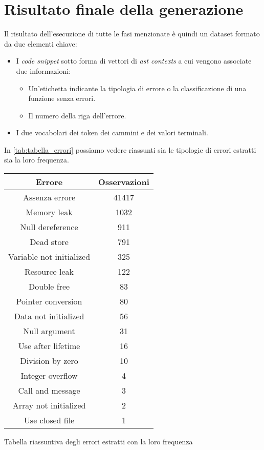 \section{Risultato finale della generazione}
Il risultato dell'esecuzione di tutte le fasi menzionate è quindi un dataset formato da due elementi chiave:
    \begin{itemize}
        \item I \textit{code snippet} sotto forma di vettori di \textit{ast contexts} a cui vengono associate due informazioni:
        \begin{itemize}
            \item Un'etichetta indicante la tipologia di errore o la classificazione di una funzione senza errori.
            \item Il numero della riga dell'errore.
        \end{itemize}
        \item I due vocabolari dei token dei cammini e dei valori terminali.
    \end{itemize}
In \autoref{tab:tabella_errori} possiamo vedere riassunti sia le tipologie di errori estratti sia la loro frequenza.
    \begin{center}
      \begin{tabular}{|c|c|}
        \hline
        Errore & Osservazioni \\
        \hline
        Assenza errore & 41417 \\
        \hline
        Memory leak & 1032 \\
        \hline
        Null dereference & 911 \\
        \hline
        Dead store & 791 \\
        \hline
        Variable not initialized & 325 \\
        \hline
        Resource leak & 122 \\
        \hline
        Double free & 83 \\
        \hline
        Pointer conversion & 80 \\
        \hline
        Data not initialized & 56 \\
        \hline
        Null argument & 31 \\
        \hline
        Use after lifetime & 16 \\
        \hline
        Division by zero & 10 \\
        \hline
        Integer overflow & 4 \\
        \hline
        Call and message & 3 \\
        \hline
        Array not initialized & 2 \\
        \hline
        Use closed file & 1 \\
        \hline
      \end{tabular}
      \caption{Tabella riassuntiva degli errori estratti con la loro frequenza}
      \label{tab:tabella_errori}
    \end{center}


